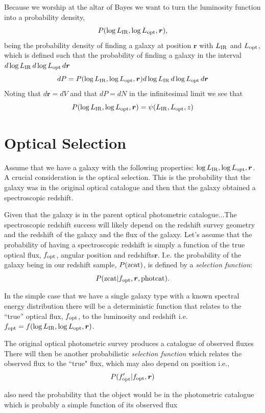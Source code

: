 \documentclass[a4paper,11pt]{article}
\begin{document}
Because we worship at the altar of Bayes we want to turn the luminosity function into a probability density, 
$$P(\log L_{\rm IR},\log L_{\rm opt},\bm{r}),$$ being the probability density of finding a galaxy at position $\bm{r}$ with $L_{\rm IR}$ and $L_{\rm opt}$, which is defined such that the probability of finding a galaxy in the interval $d\log L_{\rm IR}\,d\log L_{\rm opt}\, d \bm{r}$
$$dP=P(\log L_{\rm IR},\log L_{\rm opt},\bm{r}) d\log L_{\rm IR}\,d\log L_{\rm opt}\,d\bm{r}$$
Noting that $d\bm{r}=dV$ and that $dP = dN$ in the infinitesimal limit we see that 
$$P(\log L_{\rm IR},\log L_{\rm opt},\bm{r})=\psi( L_{\rm IR},L_{\rm opt},z)$$

\section{Optical Selection}
Assume that we have a galaxy with the following properties: $\log L_{\rm IR},\log L_{\rm opt},\bm{r}$.
A crucial consideration is the optical selection. This is the probability that the galaxy was in the original optical catalogue and then that the galaxy obtained a spectroscopic redshift. 

Given that the galaxy is in the parent optical photometric catalogue...The spectroscopic redshift success will likely depend on the redshift survey geometry and the redshift of the galaxy and the flux of the galaxy. Let's assume that the probability of having a spectroscopic redshift is simply a function of the true optical flux, $f_{\rm opt}$, angular position and redshifts$ \bm{r}$.  I.e. the probability of the galaxy being in our redshift sample, $P({\rm zcat})$, is defined by a {\em selection function}:
$$P({\rm zcat}| f_{\rm opt}, \bm{r}, {\rm photcat}).$$  

In the simple case that we have a single galaxy type with a known spectral energy distribution there will be a deterministic function that relates to the ``true'' optical flux, $f_{\rm opt}$, to the luminosity and redshift i.e.
$f_{\rm opt}=f(\log L_{\rm IR},\log L_{\rm opt},\bm{r})$.

The original optical photometric survey produces a catalogue of observed fluxes There will then be another probabilistic {\em selection function} which relates the observed flux to the ``true" flux, which may also depend on position i.e.,
$$ P(f_{\rm opt}^\prime|f_{\rm opt},\bm{r})$$

also need the probability that the object would be in the photometric catalogue which is probably a simple function of its observed flux
\end{document}
